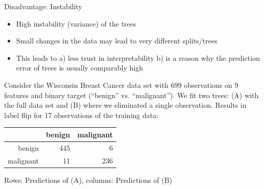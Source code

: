 \documentclass[11pt,compress,t,notes=noshow, xcolor=table]{beamer}
\begin{document}
 \begin{vbframe}{Disadvantage: Instability}
 \begin{itemize}
 \item High instability (variance) of the trees
 \item Small changes in the data may lead to very different splits/trees
 \item This leads to a) less trust in interpretability b) is a reason why the prediction error of trees is usually comparably high
 \end{itemize}

Consider the Wisconsin Breast Cancer data set with 699 observations on 9 features and binary target (\enquote{benign} vs. \enquote{malignant}). We fit two trees: (A) with the full data set and (B) where we eliminated a single observation. Results in label flip for 17 observations of the training data:

\begin{table}[ht]
\centering
\begin{tabular}{rrr}
  \hline
 & benign & malignant \\ 
  \hline
benign & 445 &   6 \\ 
  malignant &  11 & 236 \\ 
   \hline
\end{tabular}
\end{table}

Rows: Predictions of (A), columns: Predictions of (B) %



\end{vbframe}
\end{document}
